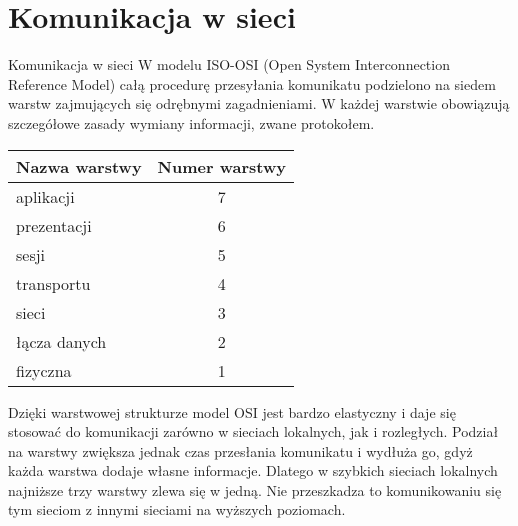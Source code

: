 \documentclass[a4paper,11pt]{article}
\begin{document}
 
\section*{Komunikacja w sieci}
Komunikacja w sieci W modelu ISO-OSI (Open System Interconnection Reference Model) całą procedurę przesyłania komunikatu podzielono na siedem warstw zajmujących się odrębnymi zagadnieniami. W każdej warstwie obowiązują szczegółowe zasady wymiany informacji, zwane protokołem.

\begin{table}[!htb]
\label{tab:warunkiTerenowe}
\begin{center}
\begin{tabular}{|l|c|}
\hline
Nazwa warstwy & Numer warstwy \\ \hline
aplikacji & 7 \\ \hline
prezentacji & 6 \\ \hline
sesji & 5 \\ \hline \hline
transportu & 4 \\ \hline
sieci & 3 \\ \hline
łącza danych & 2 \\ \hline
fizyczna & 1 \\ \hline
\end{tabular}
\end{center}
\end{table}

Dzięki warstwowej strukturze model OSI jest bardzo elastyczny i daje się stosować do komunikacji zarówno w sieciach lokalnych, jak i rozległych. Podział na warstwy zwiększa jednak czas przesłania komunikatu i wydłuża go, gdyż każda warstwa dodaje własne informacje. Dlatego w szybkich sieciach lokalnych najniższe trzy warstwy zlewa się w jedną. Nie przeszkadza to komunikowaniu się tym sieciom z innymi sieciami na wyższych poziomach.
\end{document}

